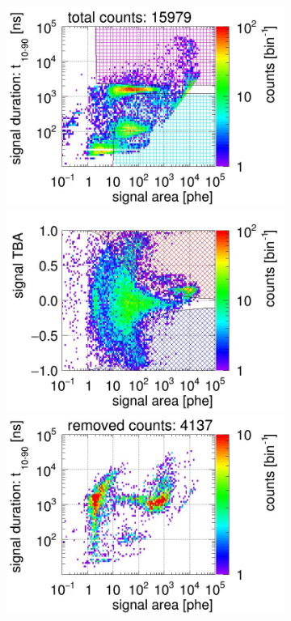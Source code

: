 \begin{landscape}
\begin{figure}[!p]
\begin{subfigure}[t]{0.32\textwidth}
			\includegraphics[width=\figurewidth,clip,trim={0 98 0 15}]{Figures/GasTest/CutsValid/res64769/pdpa26Vecfig64769.jpg}
			\includegraphics[width=\figurewidth,clip,trim={0 98 0 40}]{Figures/GasTest/CutsValid/res64769/tbapa26Vecfig64769.jpg}
			\includegraphics[width=\figurewidth,clip,trim={0 98 0 15}]{Figures/GasTest/CutsValid/res64769/pdpaX26Vecfig64769.jpg}

\end{subfigure}
\end{figure}
\end{landscape}
